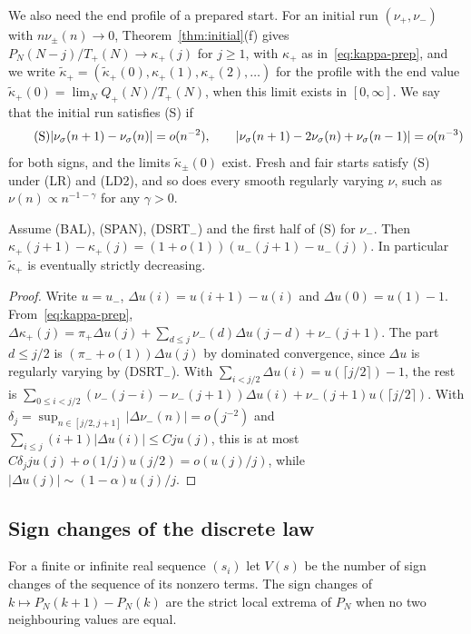 We also need the end profile of a prepared start. For an initial run $(\nu_\plus,\nu_\minus)$ with
$n\nu_\pm(n)\to0$, Theorem~\ref{thm:initial}(f) gives $P_N(N-j)/T_\plus(N)\to\kappa_\plus(j)$ for
$j\ge1$, with $\kappa_\plus$ as in~\eqref{eq:kappa-prep}, and we write
$\widetilde\kappa_\plus=(\widetilde\kappa_\plus(0),\kappa_\plus(1),\kappa_\plus(2),\dots)$ for the
profile with the end value $\widetilde\kappa_\plus(0)=\lim_NQ_\plus(N)/T_\plus(N)$, when this limit
exists in $[0,\infty]$. We say that the initial run satisfies (S) if
\begin{equation}\label{eq:S}\tag{S}
 |\nu_\sigma(n+1)-\nu_\sigma(n)|=o(n^{-2}),\qquad
 |\nu_\sigma(n+1)-2\nu_\sigma(n)+\nu_\sigma(n-1)|=o(n^{-3})
\end{equation}
for both signs, and the limits $\widetilde\kappa_\pm(0)$ exist. Fresh and fair starts satisfy (S)
under (LR) and (LD2), and so does every smooth regularly varying $\nu$, such as
$\nu(n)\propto n^{-1-\gamma}$ for any $\gamma>0$.

\begin{lemma}\label{lem:prep-profile}
Assume (BAL), (SPAN), (DSRT$_\minus$) and the first half of (S) for $\nu_\minus$. Then
$\kappa_\plus(j+1)-\kappa_\plus(j)=(1+o(1))(u_\minus(j+1)-u_\minus(j))$. In particular
$\widetilde\kappa_\plus$ is eventually strictly decreasing.
\end{lemma}

\begin{proof}
Write $u=u_\minus$, $\Delta u(i)=u(i+1)-u(i)$ and $\Delta u(0)=u(1)-1$. From~\eqref{eq:kappa-prep},
$\Delta\kappa_\plus(j)=\pi_\plus\Delta u(j)+\sum_{d\le j}\nu_\minus(d)\Delta u(j-d)+\nu_\minus(j+1)$. The
part $d\le j/2$ is $(\pi_\minus+o(1))\Delta u(j)$ by dominated convergence, since $\Delta u$ is
regularly varying by (DSRT$_\minus$). With $\sum_{i<j/2}\Delta u(i)=u(\lceil j/2\rceil)-1$, the rest
is $\sum_{0\le i<j/2}(\nu_\minus(j-i)-\nu_\minus(j+1))\Delta u(i)+\nu_\minus(j+1)u(\lceil j/2\rceil)$. With
$\delta_j=\sup_{n\in[j/2,j+1]}|\Delta\nu_\minus(n)|=o(j^{-2})$ and
$\sum_{i\le j}(i+1)|\Delta u(i)|\le Cju(j)$, this is at most $C\delta_jju(j)+o(1/j)u(j/2)=o(u(j)/j)$,
while $|\Delta u(j)|\sim(1-\alpha)u(j)/j$.
\end{proof}

\subsection{Sign changes of the discrete law}\label{sec:signs}

For a finite or infinite real sequence $(s_i)$ let $V(s)$ be the number of sign changes of
the sequence of its nonzero terms. The sign changes of $k\mapsto P_N(k+1)-P_N(k)$ are the
strict local extrema of $P_N$ when no two neighbouring values are equal.

